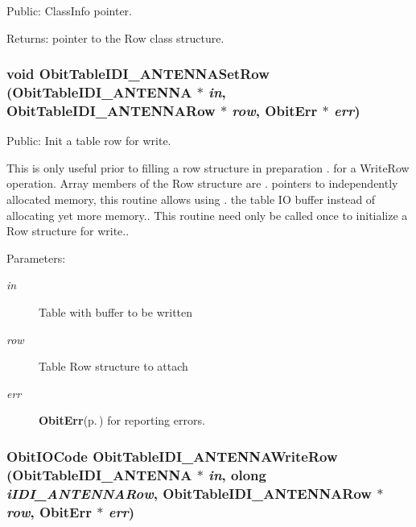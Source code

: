 Public: Class\-Info pointer. 

\begin{Desc}
\item[Returns:]pointer to the Row class structure. \end{Desc}
\subsubsection{\setlength{\rightskip}{0pt plus 5cm}void Obit\-Table\-IDI\_\-ANTENNASet\-Row ({\bf Obit\-Table\-IDI\_\-ANTENNA} $\ast$ {\em in}, {\bf Obit\-Table\-IDI\_\-ANTENNARow} $\ast$ {\em row}, {\bf Obit\-Err} $\ast$ {\em err})}\label{ObitTableIDI__ANTENNA_8h_a19}


Public: Init a table row for write. 

This is only useful prior to filling a row structure in preparation . for a Write\-Row operation. Array members of the Row structure are . pointers to independently allocated memory, this routine allows using . the table IO buffer instead of allocating yet more memory.. This routine need only be called once to initialize a Row structure for write.. \begin{Desc}
\item[Parameters:]
\begin{description}
\item[{\em in}]Table with buffer to be written \item[{\em row}]Table Row structure to attach \item[{\em err}]{\bf Obit\-Err}{\rm (p.\,\pageref{structObitErr})} for reporting errors. \end{description}
\end{Desc}
\subsubsection{\setlength{\rightskip}{0pt plus 5cm}Obit\-IOCode Obit\-Table\-IDI\_\-ANTENNAWrite\-Row ({\bf Obit\-Table\-IDI\_\-ANTENNA} $\ast$ {\em in}, {\bf olong} {\em i\-IDI\_\-ANTENNARow}, {\bf Obit\-Table\-IDI\_\-ANTENNARow} $\ast$ {\em row}, {\bf Obit\-Err} $\ast$ {\em err})}\label{ObitTableIDI__ANTENNA_8h_a20}


